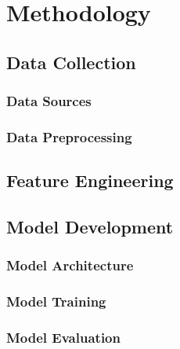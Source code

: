 \section{Methodology}

\subsection{Data Collection}
\label{sec:Data Collection}

\subsubsection{Data Sources}
\label{sec:Data Sources}

\subsubsection{Data Preprocessing}
\label{sec:Data Preprocessing}

\subsection{Feature Engineering}
\label{sec:Feature Engineering}

\subsection{Model Development}
\label{sec:Model Development}

\subsubsection{Model Architecture}
\label{sec:Model Architecture}

\subsubsection{Model Training}
\label{sec:Model Training}

\subsubsection{Model Evaluation}
\label{sec:Model Evaluation}